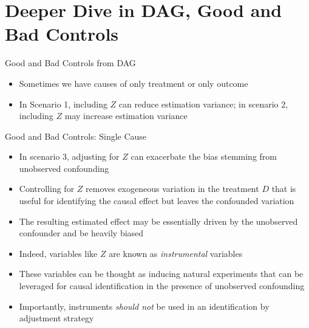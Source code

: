 \documentclass[aspectratio=1610,12pt,xcolor=dvipsnames]{beamer}
\begin{document}
\section{Deeper Dive in DAG, Good and Bad Controls}
\begin{frame}
    \sectionpage
\end{frame}

\begin{frame}{Good and Bad Controls from DAG}

\begin{itemize}
    \item Sometimes we have causes of only treatment or only outcome
    \item In Scenario 1, including $Z$ can reduce estimation variance; in scenario 2, including $Z$ may increase estimation variance
\end{itemize}

\end{frame}

\begin{frame}{Good and Bad Controls: Single Cause}
    \begin{itemize}
    \item In scenario 3, adjusting for $Z$ can exacerbate the bias stemming from unobserved confounding
    \item Controlling for $Z$ removes exogeneous variation in the treatment $D$ that is useful for identifying the causal effect but leaves the confounded variation
    \item The resulting estimated effect may be essentially driven by the unobserved confounder and be heavily biased \pause
    \item Indeed, variables like $Z$ are known as \textit{instrumental} variables
    \item These variables can be thought as inducing natural experiments that can be leveraged for causal identification in the presence of unobserved confounding
    \item Importantly, instruments \textit{should not} be used in an identification by adjustment strategy
    \end{itemize}
\end{frame}
\end{document}
